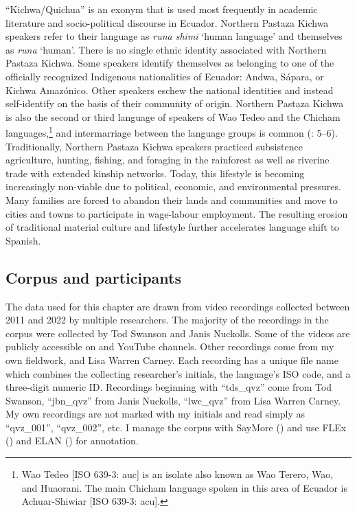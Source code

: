 \documentclass[output=paper]{langscibook}
\begin{document}
“Kichwa/Quichua” is an exonym that is used most frequently in academic literature and socio-political discourse in Ecuador. Northern Pastaza Kichwa speakers refer to their language as \textit{runa shimi} ‘human language’ and themselves as \textit{runa} ‘human’. There is no single ethnic identity associated with Northern Pastaza Kichwa. Some speakers identify themselves as belonging to one of the officially recognized Indigenous nationalities of Ecuador: Andwa, Sápara, or Kichwa Amazónico. Other speakers eschew the national identities and instead self-identify on the basis of their community of origin. Northern Pastaza Kichwa is also the second or third language of speakers of Wao Tedeo and the Chicham languages,\footnote{Wao Tedeo [ISO 639-3: auc] is an isolate also known as Wao Terero, Wao, and Huaorani. The main Chicham language spoken in this area of Ecuador is Achuar-Shiwiar [ISO 639-3: acu].} and intermarriage between the language groups is common (\citealt{Reeve2022}: 5–6). Traditionally, Northern Pastaza Kichwa speakers practiced subsistence agriculture, hunting, fishing, and foraging in the rainforest as well as riverine trade with extended kinship networks. Today, this lifestyle is becoming increasingly non-viable due to political, economic, and environmental pressures. Many families are forced to abandon their lands and communities and move to cities and towns to participate in wage-labour employment. The resulting erosion of traditional material culture and lifestyle further accelerates language shift to Spanish. 

\subsection{Corpus and participants}
\label{sec:rice:2.2}

The data used for this chapter are drawn from video recordings collected between 2011 and 2022 by multiple researchers. The majority of the recordings in the corpus were collected by Tod Swanson and Janis Nuckolls. Some of the videos are publicly accessible on   and  YouTube channels. Other recordings come from my own fieldwork, and Lisa Warren Carney. Each recording has a unique file name which combines the collecting researcher’s initials, the language’s ISO code, and a three-digit numeric ID. Recordings beginning with “tds\_qvz” come from Tod Swanson, “jbn\_qvz” from Janis Nuckolls, “lwc\_qvz” from Lisa Warren Carney. My own recordings are not marked with my initials and read simply as “qvz\_001”, “qvz\_002”, etc. I manage the corpus with SayMore (\citeyear{SIL2021}) and use FLEx (\citeyear{FLEX}) and ELAN (\citeyear{ELAN}) for annotation.
\end{document}
